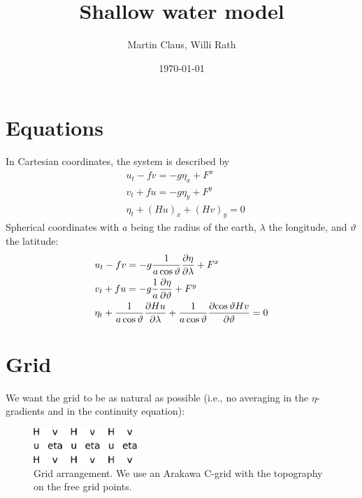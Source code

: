 \documentclass[a4paper]{article}
\title{Shallow water model}
\author{Martin Claus, Willi Rath}
\date{\today}
\begin{document}
\maketitle


\section{Equations}

In Cartesian coordinates, the system is described by
\begin{align}
  & u_t - fv = -g \eta_x + F^x \\
  & v_t + fu = -g \eta_y + F^y \\
  & \eta_t + (Hu)_x + (Hv)_y = 0
\end{align}
Spherical coordinates with $a$ being the radius of the earth, $\lambda$ the 
longitude, and $\vartheta$ the latitude:
\begin{align}
  & u_t - fv = -g \frac{1}{a\cos\vartheta}\frac{\partial {\eta}}{\partial {\lambda}} + F^x \\
  & v_t + fu = -g \frac{1}{a}\frac{\partial {\eta}}{\partial {\vartheta}} + F^y \\
  & \eta_t + \frac{1}{a\cos\vartheta}\frac{\partial {Hu}}{\partial {\lambda}} + \frac{1}{a\cos\vartheta}\frac{\partial {\cos\vartheta Hv}}{\partial {\vartheta}} = 0
\end{align}


\section{Grid}

We want the grid to be as natural as possible (i.e., no averaging in the 
$\eta$-gradients and in the continuity equation):

\begin{figure}[h]
  \begin{center}
    \includegraphics[width=0.35\textwidth]{images/grid}
  \end{center}
  \caption{Grid arrangement. We use an Arakawa C-grid with the topography
    on the free grid points.  }
\end{figure}
\end{document}
